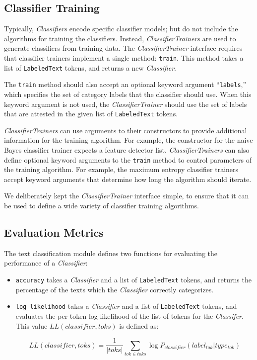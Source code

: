 \documentclass[12pt]{article}
\begin{document}
  \subsection{Classifier Training}

    Typically, \textit{Classifiers} encode specific classifier models;
    but do not include the algorithms for training the classifiers.
    Instead, \textit{ClassifierTrainers} are used to generate
    classifiers from training data.  The \textit{ClassifierTrainer}
    interface requires that classifier trainers implement a single
    method: \texttt{train}.  This method takes a list of
    \texttt{LabeledText} tokens, and returns a new
    \textit{Classifier}.  

    The \texttt{train} method should also accept an optional keyword
    argument ``\texttt{labels},'' which specifies the set of category
    labels that the classifier should use.  When this keyword argument
    is not used, the \textit{ClassifierTrainer} should use the set of
    labels that are attested in the given list of \texttt{LabeledText}
    tokens.  

    \textit{ClassifierTrainers} can use arguments to their
    constructors to provide additional information for the training
    algorithm.  For example, the constructor for the naive Bayes
    classifier trainer expects a feature detector list.
    \textit{ClassifierTrainers} can also define optional keyword
    arguments to the \texttt{train} method to control parameters of
    the training algorithm.  For example, the maximum entropy
    classifier trainers accept keyword arguments that determine how
    long the algorithm should iterate.

    We deliberately kept the \textit{ClassifierTrainer} interface
    simple, to ensure that it can be used to define a wide variety of
    classifier training algorithms.  

  \subsection{Evaluation Metrics}

    The text classification module defines two functions for
    evaluating the performance of a \textit{Classifier}:

    \begin{itemize}

      \item \texttt{accuracy} takes a \textit{Classifier} and a list
      of \texttt{LabeledText} tokens, and returns the percentage of
      the texts which the \textit{Classifier} correctly categorizes.

      \item \texttt{log\_likelihood} takes a \textit{Classifier} and a
      list of \texttt{LabeledText} tokens, and evaluates the per-token
      log likelihood of the list of tokens for the \textit{Classifer}.
      This value $LL(classifier, toks)$ is defined as:

      $$LL(classifier, toks) = \frac{1}{|toks|}\sum_{tok \in toks} 
        \log P_{classifier}(label_{tok}|type_{tok})$$
    \end{itemize}
\end{document}
